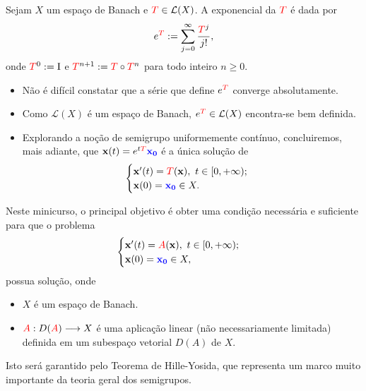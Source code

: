 \begin{frame}

\begin{definition}\label{expoperator}
    Sejam $X$ um espaço de Banach e ${\color{red}T}\in \mathcal L (X)$. A {\color{blue}exponencial} da ${\color{red}T}$ é dada por
    \begin{equation}\label{expt}
    \displaystyle e^{{\color{red}T}}:=\sum_{j=0}^{\infty} \frac{{\color{red}T}^j}{j!},
    \end{equation}
    onde ${\color{red}T}^0:=\operatorname{I}$ e ${\color{red}T}^{n+1} := {\color{red}T}\circ {\color{red}T}^{n}$ para todo inteiro $n\geq 0$.
\end{definition}

\begin{itemize}
\item Não é difícil constatar que a série que define $e^{{\color{red}T}}$ 
{\color{blue}converge absolutamente}.  

\item Como $\mathcal L(X)$ é um espaço de Banach, 
$e^{{\color{red}T}}\in \mathcal{L}(X)$ encontra-se bem definida.

\item Explorando a noção de {\color{blue}semigrupo uniformemente contínuo}, concluiremos, mais adiante, que $\mathbf{x} (t)=e^{t{\color{red}T}}{\color{blue}\mathbf{x_0}}$ 
é a única solução de
\[
\begin{cases}
    \mathbf{x'}(t)={\color{red}T}(\mathbf{x}),\ t\in [0,+\infty);\\
    \mathbf{x}(0)={\color{blue}\mathbf{x_0}} \in X.
\end{cases}
\]
\end{itemize}
\end{frame}

\begin{frame}
Neste minicurso, o principal objetivo é obter uma condição necessária e suficiente para que o problema
\[
\begin{cases}
    \mathbf{x'}(t)={\color{red}A}(\mathbf{x}),\ t\in [0,+\infty);\\
    \mathbf{x}(0)={\color{blue}\mathbf{x_0}} \in X,
\end{cases}
\]
possua solução, onde
\begin{itemize}
\item $X$ é um espaço de Banach.
\item ${\color{red}A}:D({\color{red}A})\longrightarrow X$ é uma aplicação linear {\color{red} (não necessariamente limitada)} definida em um subespaço vetorial $D(A)$ de $X$.
\end{itemize}

Isto será garantido pelo  {\color{blue}Teorema de Hille-Yosida}, que representa um marco muito importante da teoria geral dos semigrupos.

\end{frame}


